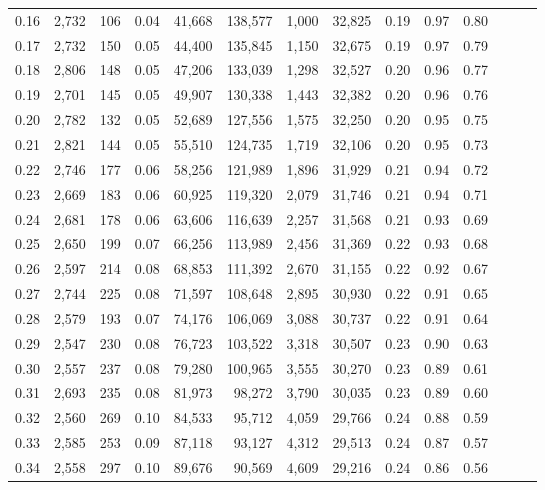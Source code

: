 \begin{tabular}{rrrrrrrrrrrrrr}
0.16 &  2,732 &  106 &  0.04 &   41,668 &  138,577 &   1,000 &  32,825 &  0.19 &  0.97 &      0.80 \\
0.17 &  2,732 &  150 &  0.05 &   44,400 &  135,845 &   1,150 &  32,675 &  0.19 &  0.97 &      0.79 \\
0.18 &  2,806 &  148 &  0.05 &   47,206 &  133,039 &   1,298 &  32,527 &  0.20 &  0.96 &      0.77 \\
0.19 &  2,701 &  145 &  0.05 &   49,907 &  130,338 &   1,443 &  32,382 &  0.20 &  0.96 &      0.76 \\
0.20 &  2,782 &  132 &  0.05 &   52,689 &  127,556 &   1,575 &  32,250 &  0.20 &  0.95 &      0.75 \\
0.21 &  2,821 &  144 &  0.05 &   55,510 &  124,735 &   1,719 &  32,106 &  0.20 &  0.95 &      0.73 \\
0.22 &  2,746 &  177 &  0.06 &   58,256 &  121,989 &   1,896 &  31,929 &  0.21 &  0.94 &      0.72 \\
0.23 &  2,669 &  183 &  0.06 &   60,925 &  119,320 &   2,079 &  31,746 &  0.21 &  0.94 &      0.71 \\
0.24 &  2,681 &  178 &  0.06 &   63,606 &  116,639 &   2,257 &  31,568 &  0.21 &  0.93 &      0.69 \\
0.25 &  2,650 &  199 &  0.07 &   66,256 &  113,989 &   2,456 &  31,369 &  0.22 &  0.93 &      0.68 \\
0.26 &  2,597 &  214 &  0.08 &   68,853 &  111,392 &   2,670 &  31,155 &  0.22 &  0.92 &      0.67 \\
0.27 &  2,744 &  225 &  0.08 &   71,597 &  108,648 &   2,895 &  30,930 &  0.22 &  0.91 &      0.65 \\
0.28 &  2,579 &  193 &  0.07 &   74,176 &  106,069 &   3,088 &  30,737 &  0.22 &  0.91 &      0.64 \\
0.29 &  2,547 &  230 &  0.08 &   76,723 &  103,522 &   3,318 &  30,507 &  0.23 &  0.90 &      0.63 \\
0.30 &  2,557 &  237 &  0.08 &   79,280 &  100,965 &   3,555 &  30,270 &  0.23 &  0.89 &      0.61 \\
0.31 &  2,693 &  235 &  0.08 &   81,973 &   98,272 &   3,790 &  30,035 &  0.23 &  0.89 &      0.60 \\
0.32 &  2,560 &  269 &  0.10 &   84,533 &   95,712 &   4,059 &  29,766 &  0.24 &  0.88 &      0.59 \\
0.33 &  2,585 &  253 &  0.09 &   87,118 &   93,127 &   4,312 &  29,513 &  0.24 &  0.87 &      0.57 \\
0.34 &  2,558 &  297 &  0.10 &   89,676 &   90,569 &   4,609 &  29,216 &  0.24 &  0.86 &      0.56 \\

\end{tabular}
